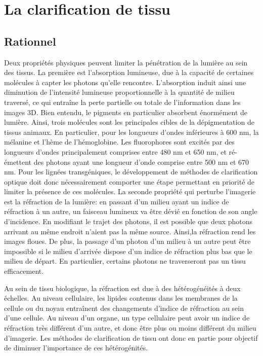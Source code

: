 \documentclass[\main/main.tex]{subfiles}
\begin{document}
\section{La clarification de tissu}

\subsection{Rationnel}

%
Deux propriétés physiques peuvent limiter la pénétration de la lumière au sein des tissus\cite{sandell_2011}. La première est l'absorption lumineuse, due à la capacité de certaines molécules à capter les photons qu'elle rencontre.
%
L'absorption induit ainsi une diminution de l'intensité lumineuse proportionnelle à la quantité de milieu traversé, ce qui entraîne la perte partielle ou totale de l'information dans les images 3D.
%
Bien entendu, le pigments en particulier absorbent énormément de lumière. Ainsi, trois molécules sont les principales cibles de la dépigmentation de tissus animaux\cite{sandell_2011,antinucci_2016,pende_2020}. En particulier, pour les longueurs d'ondes inférieures à 600 nm, la mélanine et l'hème de l'hémoglobine. Les fluorophores sont excités par des longueurs d'ondes principalement comprises entre 480 nm et 650 nm, et ré-émettent des photons ayant une longueur d'onde comprise entre 500 nm et 670 nm.
Pour les lignées transgéniques, le développement de méthodes de clarification optique doit donc nécessairement comporter une étape permettant en priorité de limiter la présence de ces molécules.
%
La seconde propriété qui perturbe l'imagerie est la réfraction de la lumière: en passant d'un milieu ayant un indice de réfraction à un autre, un faisceau lumineux va être dévié en fonction de son angle d'incidence. En modifiant le trajet des photons, il est possible que deux photons arrivant au même endroit n'aient pas la même source. Ainsi,la réfraction rend les images floues.
%
De plus, la passage d'un photon d'un milieu à un autre peut être impossible si le milieu d'arrivée dispose d'un indice de réfraction plus bas que le milieu de départ. En particulier, certains photons ne traverseront pas un tissu efficacement.

%
Au sein de tissu biologique, la réfraction est due à des hétérogénéités à deux échelles. Au niveau cellulaire, les lipides contenus dans les membranes de la cellule ou du noyau entraînent des changements d'indice de réfraction au sein d'une cellule. Au niveau d'un organe, un type cellulaire peut avoir un indice de réfraction très différent d'un autre, et donc être plus ou moins différent du milieu d'imagerie.
%
Les méthodes de clarification de tissu ont donc en partie pour objectif de diminuer l'importance de ces hétérogénités.
\end{document}
